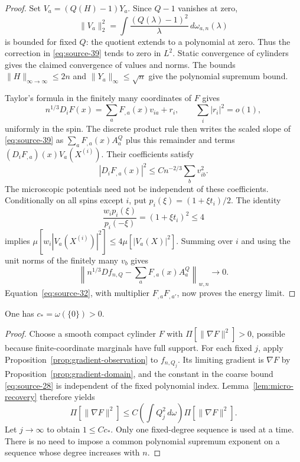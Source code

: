 \begin{proof}
Set $V_a=(Q(H)-1)Y_a$. Since $Q-1$ vanishes at zero,
\[
 \|V_a\|_2^2
   =\int\frac{(Q(\lambda)-1)^2}{\lambda}
                                     \,d\omega_{a,n}(\lambda)
\]
is bounded for fixed $Q$: the quotient extends to a polynomial at zero.
Thus the correction in \eqref{eq:source-39} tends to zero in $L^2$.
Static convergence of cylinders gives the claimed convergence of values
and norms. The bounds $\|H\|_{\infty\to\infty}\le2n$ and
$\|Y_a\|_\infty\le\sqrt n$ give the polynomial supremum bound.

Taylor's formula in the finitely many coordinates of $F$ gives
\[
 n^{1/3}D_iF(x)=\sum_aF_{,a}(x)v_{ia}+r_i,
 \qquad \sum_i|r_i|^2=o(1),
\]
uniformly in the spin. The discrete product rule then writes the scaled
slope of \eqref{eq:source-39} as $\sum_aF_{,a}(x)A_a^Q$ plus this remainder
and terms $(D_iF_{,a})(x)V_a(X^{(i)})$. Their coefficients satisfy
\[
 |D_iF_{,a}(x)|^2\le Cn^{-2/3}\sum_bv_{ib}^2.
\]
The microscopic potentials need not be independent of these coefficients.
Conditionally on all spins except $i$, put
$p_i(\xi)=(1+\xi t_i)/2$. The identity
\[
 \frac{w_ip_i(\xi)}{p_i(-\xi)}=(1+\xi t_i)^2\le4
\]
implies
$\mu[w_i|V_a(X^{(i)})|^2]\le4\mu[|V_a(X)|^2]$.
Summing over $i$ and using the unit norms of the finitely many $v_b$ gives
\[
 \left\|n^{1/3}Df_{n,Q}-\sum_aF_{,a}(x)A_a^Q\right\|_{w,n}\to0.
\]
Equation~\eqref{eq:source-32}, with multiplier $F_{,a}F_{,a'}$, now proves
the energy limit.
\end{proof}

\begin{lemma}
\label{lem:micro-positivity}
One has $c_*=\omega(\{0\})>0$.
\end{lemma}

\begin{proof}
Choose a smooth compact cylinder $F$ with
$\Pi[\|\nabla F\|^2]>0$, possible because finite-coordinate marginals have
full support. For each fixed $j$, apply
Proposition~\ref{prop:gradient-observation} to $f_{n,Q_j}$.
Its limiting gradient is $\nabla F$ by
Proposition~\ref{prop:gradient-domain}, and the constant in the coarse
bound \eqref{eq:source-28} is independent of the fixed polynomial index.
Lemma~\ref{lem:micro-recovery} therefore yields
\[
 \Pi[\|\nabla F\|^2]
   \le C\left(\int Q_j^2\,d\omega\right)\Pi[\|\nabla F\|^2].
\]
Let $j\to\infty$ to obtain $1\le Cc_*$. Only one fixed-degree sequence is
used at a time. There is no need to impose a common polynomial supremum
exponent on a sequence whose degree increases with $n$.
\end{proof}

